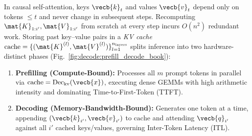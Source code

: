 \documentclass[../../../../master.tex]{subfiles}
\begin{document}
In causal self-attention, keys $\vecb{k}_{t}$ and values $\vecb{v}_{t}$ depend only on tokens $\le t$ and never change in subsequent steps. Recomputing $\mat{K}_{1:i'}, \mat{V}_{1:i'}$ from scratch at every step incurs $O(n^2)$ redundant work. Storing past key--value pairs in a \emph{KV cache} $\mathrm{cache} = \{(\mat{K}^{(l)}, \mat{V}^{(l)})\}_{l=1}^{n_{\mathrm{layers}}}$ splits inference into two hardware-distinct phases  (Fig.~\ref{fig:decode:prefill_decode_book}):
\begin{enumerate}
  \item \textbf{Prefilling (Compute-Bound):} Processes all $m$ prompt tokens in parallel via $\mathrm{cache} = \mathrm{Dec}_{\mathrm{kv}}(\vecb{x})$, executing dense GEMMs with high arithmetic intensity and dominating Time-to-First-Token (TTFT).
  \item \textbf{Decoding (Memory-Bandwidth-Bound):} Generates one token at a time, appending $(\vecb{k}_{i'}, \vecb{v}_{i'})$ to $\mathrm{cache}$ and attending $\vecb{q}_{i'}$ against all $i'$ cached keys/values, governing Inter-Token Latency (ITL).
\end{enumerate}

\end{document}
